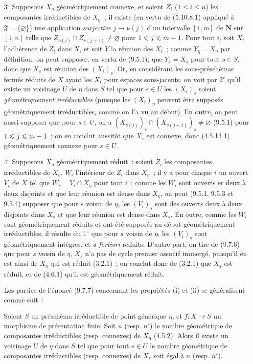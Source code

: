 3$^\circ$ Supposons $X_\eta$ géométriquement connexe, et soient $Z_i$
($1\leqslant i\leqslant n$) les composantes irréductibles de $X_\eta$~; il
existe (en vertu de (5.10.8.1) appliqué à $\mathfrak F=\{\varnothing\}$) une
application \emph{surjective} $j\to\nu(j)$ d'un intervalle $[1,m]$ de
$\mathbf N$ sur $[1,n]$ telle que
$Z_{\nu(j)}\cap Z_{\nu(j+1)}\neq\varnothing$ pour $1\leqslant j\leqslant m- 1$.
Pour tout $i$, soit $X_i$ l'adhérence de $Z_i$ dans $X$, et soit $Y$ la réunion
des $X_i$~; comme $Y_\eta=X_\eta$ par définition, on peut supposer, en vertu de
(9.5.1), que $Y_s=X_s$ pour tout $s\in S$, donc que $X_s$ est réunion des
$(X_i)_s$. Or, en considérant les sous-préschémas fermés réduits de $X$ ayant
les $X_i$ pour espaces sous-jacents, on voit par 2$^\circ$ qu'il existe un
voisinage $U$ de $\eta$ dans $S$ tel que pour $s\in U$ les $(X_i)_s$ soient
\emph{géométriquement irréductibles} (puisque les $(X_i)_\eta$ peuvent être
supposés géométriquement irréductibles, comme on l'a vu au début). En outre, on
peut aussi supposer que pour $s\in U$, on a
$(X_{\nu(j)})_s\cap(X_{\nu(j+1)})_s\neq\varnothing$ (9.5.1) pour
$1\leqslant j\leqslant m- 1$~; on en conclut aussitôt que $X_s$ est connexe, donc
(4.5.13.1) géométriquement connexe pour $s\in U$.

4$^\circ$ Supposons $X_\eta$ géométriquement réduit~; soient $Z_i$ les
composantes irréductibles de $X_\eta$, $W_i$ l'intérieur de $Z_i$ dans
$X_\eta$~; il y a pour chaque $i$ un ouvert $V_i$ de $X$ tel que
$W_i=V_i\cap X_\eta$ pour tout $i$~; comme les $W_i$ sont ouverts et deux à deux
disjoints et que leur réunion est dense dans $X_\eta$, on peut (9.5.1, 9.5.3 et
9.5.4) supposer que pour $s$ voisin de $\eta$, les $(V_i)_s$ sont des ouverts
deux à deux disjoints dans $X_s$ et que leur réunion est dense dans $X_s$. En
outre, comme les $W_i$ sont géométriquement réduits et ont été supposés au
début géométriquement irréductibles, il résulte du 1$^\circ$ que pour $s$ voisin
de $\eta$, les $(V_i)_s$ sont géométriquement intègres, et \emph{a fortiori}
réduits. D'autre part, on tire de (9.7.6) que pour $s$ voisin de $\eta$, $X_s$
n'a pas de cycle premier associé immergé, puisqu'il en est ainsi de $X_\eta$
qui est réduit (3.2.1)~; on conclut donc de (3.2.1) que $X_s$ est réduit, et de
(4.6.1) qu'il est géométriquement réduit.


Les parties de l'énoncé (9.7.7) concernant les propriétés (i) et (ii) se
généralisent comme suit~:

\begin{proposition}[9.7.8]
\label{IV.9.7.8-fr}
Soient $S$ un préschéma irréductible de point générique $\eta$, et $f:X\to S$
un morphisme de présentation finie. Soit $n$ \textup{(resp. $n'$)} le nombre géométrique
de composantes irréductibles \textup{(resp.} connexes\textup{)} de $X_\eta$ \textup{(4.5.2)}. Alors il
existe un voisinage $U$ de $\eta$ dans $S$ tel que pour tout $s\in U$ le nombre
géométrique de composantes irréductibles \textup{(resp.} connexes\textup{)} de $X_s$ soit égal à
$n$ \textup{(resp. $n'$)}.
\end{proposition}

